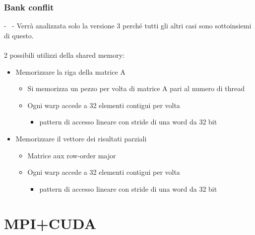 \documentclass[compress]{beamer}
\begin{document}
\subsubsection*{Bank conflit}
\begin{frame}{\secname \text{ }- \subsecname\ \text{ }- \subsubsecname}
    Verrà analizzata solo la versione 3 perché tutti gli altri casi sono sottoinsiemi di questo.\\ \\
    2 possibili utilizzi della shared memory: 
    \begin{itemize}
        \item Memorizzare la riga della matrice A 
        \begin{itemize}
            \item Si memorizza un pezzo per volta di matrice A pari al numero di thread
            \item Ogni warp accede a 32 elementi contigui per volta
            \begin{itemize}
                \item pattern di accesso lineare con stride di una word da 32 bit
            \end{itemize}
        \end{itemize}
        \item Memorizzare il vettore dei risultati parziali
        \begin {itemize}
            \item Matrice aux row-order major
            \item Ogni warp accede a 32 elementi contigui per volta
            \begin{itemize}
                \item pattern di accesso lineare con stride di una word da 32 bit
            \end{itemize}
        \end{itemize}
    \end{itemize}
\end{frame}

\section{MPI+CUDA}

\begin{frame}{\secname}
\end{frame}

\end{document}
